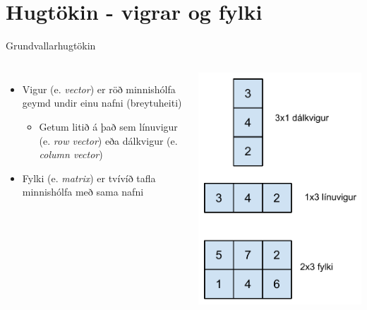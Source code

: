 \documentclass[handout]{beamer}
\begin{document}
\section{Hugtökin - vigrar og fylki}

\begin{frame}{Grundvallarhugtökin}
\begin{columns}
\begin{itemize}
 \item Vigur (e. \emph{vector}) er röð minnishólfa geymd undir einu nafni (breytuheiti)
 \begin{itemize}
  \item Getum litið á það sem línuvigur (e. \emph{row vector}) eða dálkvigur (e. \emph{column vector})
 \end{itemize}
 \item Fylki (e. \emph{matrix}) er tvívíð tafla minnishólfa með sama nafni
\end{itemize}
\begin{center}
\includegraphics[height=0.8\textheight]{../Pics/vigrar-og-fylki}
\end{center}
\end{columns}
\end{frame}
\end{document}

